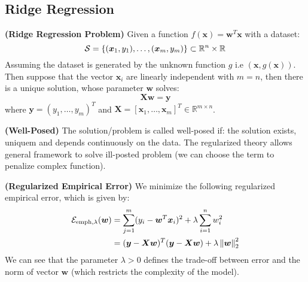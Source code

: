 \subsection{Ridge Regression}

\begin{definition}{\textbf{(Ridge Regression Problem)}}
    Given a function $f(\boldsymbol x) = \boldsymbol w^T\boldsymbol x$ with a dataset:
    \begin{equation*}
        \mathcal{S} = \left\{ (\boldsymbol x_1, y_1),\dots,(\boldsymbol x_m, y_m) \right\} \subset \mathbb{R}^n \times \mathbb{R}
    \end{equation*}
    Assuming the dataset is generated by the unknown function $g$ i.e $(\boldsymbol x, g(\boldsymbol x))$. Then suppose that the vector $\boldsymbol x_i$ are linearly independent with $m=n$, then there is a unique solution, whose parameter $\boldsymbol w$ solves:
    \begin{equation*}
        \boldsymbol X \boldsymbol w = \boldsymbol y
    \end{equation*}
    where $\boldsymbol y = (y_1,\dots, y_m)^T$ and $\boldsymbol X = [\boldsymbol x_1,\dots, \boldsymbol x_m]^T \in \mathbb{R}^{m\times n}$. 
\end{definition}

\begin{definition}{\textbf{(Well-Posed)}}
    The solution/problem is called well-posed if: the solution exists, uniquem and depends continuously on the data. The regularized theory allows general framework to solve ill-posted problem (we can choose the term to penalize complex function).
\end{definition}

\begin{definition}{\textbf{(Regularized Empirical Error)}}
    We minimize the following regularized empirical error, which is given by:
    \begin{equation*}
    \begin{aligned}
        \mathcal{E}_{\text{emph},\lambda}(\boldsymbol w) &= \sum^m_{j=1}(y_i - \boldsymbol w^T\boldsymbol x_i)^2 + \lambda \sum^n_{i=1} w_i^2 \\
        &= (\boldsymbol y - \boldsymbol X\boldsymbol w)^T(\boldsymbol y-\boldsymbol X\boldsymbol w) + \lambda \left\lVert\boldsymbol w\right\rVert^2_2
    \end{aligned}
    \end{equation*}
    We can see that the parameter $\lambda > 0$ defines the trade-off between error and the norm of vector $\boldsymbol w$ (which restricts the complexity of the model).
\end{definition}

